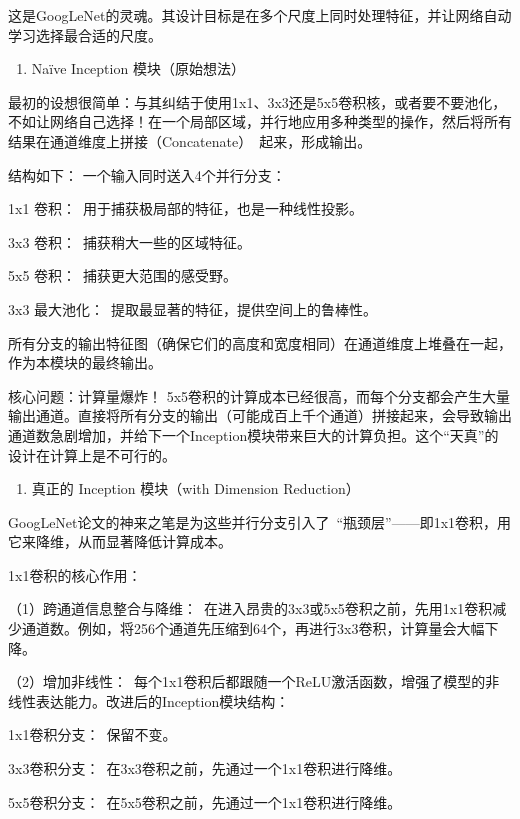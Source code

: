 这是GoogLeNet的灵魂。其设计目标是在多个尺度上同时处理特征，并让网络自动学习选择最合适的尺度。

\begin{enumerate}
\def\labelenumi{\arabic{enumi}.}
\tightlist
\item
  Naïve Inception 模块（原始想法）
\end{enumerate}

最初的设想很简单：与其纠结于使用1x1、3x3还是5x5卷积核，或者要不要池化，不如让网络自己选择！在一个局部区域，并行地应用多种类型的操作，然后将所有结果在通道维度上拼接（Concatenate）~起来，形成输出。

结构如下：
一个输入同时送入4个并行分支：

1x1 卷积：~用于捕获极局部的特征，也是一种线性投影。

3x3 卷积：~捕获稍大一些的区域特征。

5x5 卷积：~捕获更大范围的感受野。

3x3 最大池化：~提取最显著的特征，提供空间上的鲁棒性。

所有分支的输出特征图（确保它们的高度和宽度相同）在通道维度上堆叠在一起，作为本模块的最终输出。

核心问题：计算量爆炸！
5x5卷积的计算成本已经很高，而每个分支都会产生大量输出通道。直接将所有分支的输出（可能成百上千个通道）拼接起来，会导致输出通道数急剧增加，并给下一个Inception模块带来巨大的计算负担。这个``天真''的设计在计算上是不可行的。

\begin{enumerate}
\def\labelenumi{\arabic{enumi}.}
\setcounter{enumi}{1}
\tightlist
\item
  真正的 Inception 模块（with Dimension Reduction）
\end{enumerate}

GoogLeNet论文的神来之笔是为这些并行分支引入了~``瓶颈层''------即1x1卷积，用它来降维，从而显著降低计算成本。

1x1卷积的核心作用：

（1）跨通道信息整合与降维：~在进入昂贵的3x3或5x5卷积之前，先用1x1卷积减少通道数。例如，将256个通道先压缩到64个，再进行3x3卷积，计算量会大幅下降。

（2）增加非线性：~每个1x1卷积后都跟随一个ReLU激活函数，增强了模型的非线性表达能力。改进后的Inception模块结构：

1x1卷积分支：~保留不变。

3x3卷积分支：~在3x3卷积之前，先通过一个1x1卷积进行降维。

5x5卷积分支：~在5x5卷积之前，先通过一个1x1卷积进行降维。

